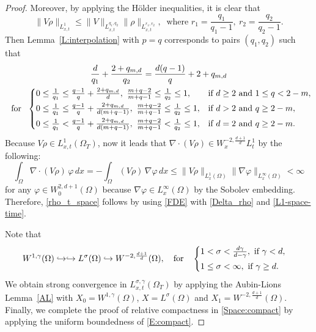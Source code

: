 \documentclass{amsart}
\numberwithin{equation}{section}
\begin{document}
\begin{proof}
Moreover, by applying the H\"{o}lder inequalities, it is clear that 
\begin{equation}\label{L1-space-time}
\|V\rho\|_{L^{1}_{x,t}} \leq \|V\|_{L_{x,t}^{q_1,q_2}}\|\rho\|_{L_{x,t}^{r_1,r_2}}, \ \text{ where }  r_1 = \frac{q_1}{q_1 - 1}, \  r_2 = \frac{q_2}{q_2 - 1}. 
\end{equation}
Then Lemma~\ref{L:interpolation} with $p=q$ corresponds to pairs $(q_1, q_2)$ such that 
\begin{equation}\label{Vrho:L1}
\begin{gathered}
\frac{d}{q_1} + \frac{2+q_{m,d}}{q_2} = \frac{d(q-1)}{q} + 2+ q_{m,d} \\ \ \text{ for } \
\begin{cases}
0 \leq \frac{1}{q_1} \leq \frac{q-1}{q}+\frac{2+q_{m,d}}{d}, \ \frac{m+q-2}{m+q-1} \leq \frac{1}{q_2} \leq 1, &  \text{if }  d\geq 2  \text{ and }  1\leq q<2-m,
\vspace{1mm}\\
	0 \leq \frac{1}{q_1} \leq \frac{q-1}{q}+\frac{2+q_{m,d}}{d(m+q-1)}, \ \frac{m+q-2}{m+q-1} \leq \frac{1}{q_2} \leq 1, &\text{if } d>2 \text{ and } q \geq 2-m,  \vspace{1 mm} \\
	 0 \leq \frac{1}{q_1} < \frac{q-1}{q}+\frac{2+q_{m,d}}{d(m+q-1)}, \ \frac{m+q-2}{m+q-1} < \frac{1}{q_2} \leq 1, &\text{if }  d=2 \text{ and } q \geq 2-m.  
	 \end{cases}
\end{gathered}\end{equation}
Because $V\rho \in L^{1}_{x,t} (\Omega_{T})$, now 
it leads that $\nabla \cdot (V\rho) \in W^{-2, \frac{d+1}{d}}_{x}L_{t}^{1}$ by the following:
\[
\int_{\Omega} \nabla \cdot (V\rho) \, \varphi \,dx = - \int_{\Omega} (V\rho) \, \nabla \varphi \,dx \leq \|V \rho\|_{L^1_{x}(\Omega)} \|\nabla \varphi\|_{L^{\infty}_{x}(\Omega)}< \infty
\]
for any $\varphi \in W_{0}^{2,d+1}(\Omega)$ because $\nabla \varphi \in L^{\infty}_{x}(\Omega)$ by the Sobolev embedding. 
Therefore, \eqref{rho_t_space} follows by using \eqref{FDE} with \eqref{Delta_rho} and \eqref{L1-space-time}.


Note that 
\[
W^{1,\gamma}(\Omega) \hookrightarrow \hookrightarrow L^{\sigma}(\Omega) \hookrightarrow W^{-2, \frac{d+1}{d}}(\Omega) , \quad 
\text{for} \quad 
\begin{cases}
	1<\sigma < \frac{d\gamma}{d-\gamma} , \text{ if } \gamma<d, \vspace{1mm}\\
	1\leq \sigma < \infty, \text{ if } \gamma \geq d. 
\end{cases}
\]
We obtain strong convergence in $L^{\sigma, \gamma}_{x,t}(\Omega_T)$ by applying the Aubin-Lions Lemma~\ref{AL} with $X_0 = W^{1,\gamma}(\Omega)$, $X=L^{\sigma}(\Omega)$ and $X_1= W^{-2, \frac{d+1}{d}}(\Omega)$.
Finally, we complete the proof of relative compactness in \eqref{Space:compact} by applying the uniform boundedness of \eqref{E:compact}. 


\end{proof}
\end{document}
